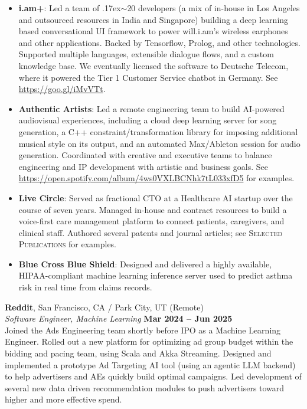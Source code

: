\documentclass[margin,line]{resume}
\begin{document}
\begin{resume}
    \begin{itemize}

    \item \textbf{i.am+}: Led a team of {\raise.17ex\hbox{$\scriptstyle\sim$}}20
      developers (a mix of in-house in Los Angeles and outsourced resources in
      India and Singapore) building a deep learning based conversational UI
      framework to power will.i.am's wireless earphones and other applications.
      Backed by Tensorflow, Prolog, and other technologies. Supported multiple
      languages, extensible dialogue flows, and a custom knowledge base. We
      eventually licensed the software to Deutsche Telecom, where it powered the
      Tier 1 Customer Service chatbot in Germany. See \url{https://goo.gl/iMvVTt}.

    \item \textbf{Authentic Artists}: Led a remote engineering team to build AI-powered audiovisual
      experiences, including a cloud deep learning server for song generation, a
      C++ constraint/transformation library for imposing additional musical style
      on its output, and an automated Max/Ableton session for audio generation.
      Coordinated with creative and executive teams to balance engineering and IP
      development with artistic and business goals. See
      \url{https://open.spotify.com/album/4ws0VXLBCNhk7tL033xfD5} for examples.

    \item \textbf{Live Circle}: Served as fractional CTO at a Healthcare AI
      startup over the course of seven years. Managed in-house and contract
      resources to build a voice-first care management platform to connect
      patients, caregivers, and clinical staff. Authored several patents and
      journal articles; see \textsc{Selected Publications} for examples.

    \item \textbf{Blue Cross Blue Shield}: Designed and delivered a highly
      available, HIPAA-compliant machine learning inference server used to
      predict asthma risk in real time from claims records.

    \end{itemize}

    \textbf{Reddit}, San Francisco, CA / Park City, UT (Remote)  \vspace{2mm}\\\vspace{1mm}%
    \textsl{Software Engineer, Machine Learning} \hfill \textbf{Mar 2024 -- Jun 2025}\\
    Joined the Ads Engineering team shortly before IPO as a Machine Learning Engineer.
    Rolled out a new platform for optimizing ad group budget within the bidding
    and pacing team, using Scala and Akka Streaming. Designed and implemented a
    prototype Ad Targeting AI tool (using an agentic LLM backend) to help
    advertisers and AEs quickly build optimal campaigns. Led development of
    several new data driven recommendation modules to push advertisers toward
    higher and more effective spend.


\end{resume}
\end{document}
